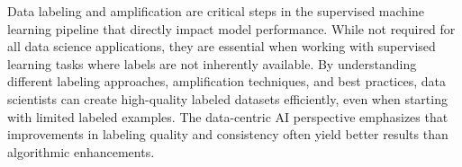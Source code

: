 \documentclass[12pt]{article}
\begin{document}
\begin{tcolorbox}[colback=red!5!white,colframe=red!75!black,title={Key Takeaway}]
Data labeling and amplification are critical steps in the supervised machine learning pipeline that directly impact model performance. While not required for all data science applications, they are essential when working with supervised learning tasks where labels are not inherently available. By understanding different labeling approaches, amplification techniques, and best practices, data scientists can create high-quality labeled datasets efficiently, even when starting with limited labeled examples. The data-centric AI perspective emphasizes that improvements in labeling quality and consistency often yield better results than algorithmic enhancements.
\end{tcolorbox}
\end{document}
